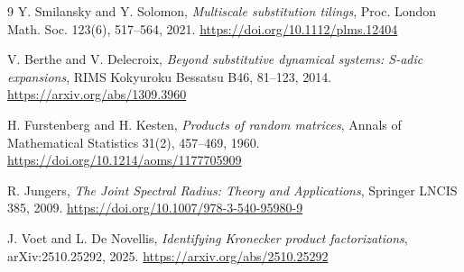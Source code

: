 \documentclass[11pt]{amsart}
\theoremstyle{definition}
\theoremstyle{remark}
\begin{document}
\begin{thebibliography}{9}
Y. Smilansky and Y. Solomon, \emph{Multiscale substitution tilings}, Proc. London Math. Soc. 123(6), 517--564, 2021. \url{https://doi.org/10.1112/plms.12404}

V. Berthe and V. Delecroix, \emph{Beyond substitutive dynamical systems: S-adic expansions}, RIMS Kokyuroku Bessatsu B46, 81--123, 2014. \url{https://arxiv.org/abs/1309.3960}

H. Furstenberg and H. Kesten, \emph{Products of random matrices}, Annals of Mathematical Statistics 31(2), 457--469, 1960. \url{https://doi.org/10.1214/aoms/1177705909}

R. Jungers, \emph{The Joint Spectral Radius: Theory and Applications}, Springer LNCIS 385, 2009. \url{https://doi.org/10.1007/978-3-540-95980-9}

J. Voet and L. De Novellis, \emph{Identifying Kronecker product factorizations}, arXiv:2510.25292, 2025. \url{https://arxiv.org/abs/2510.25292}

\end{thebibliography}
\end{document}
